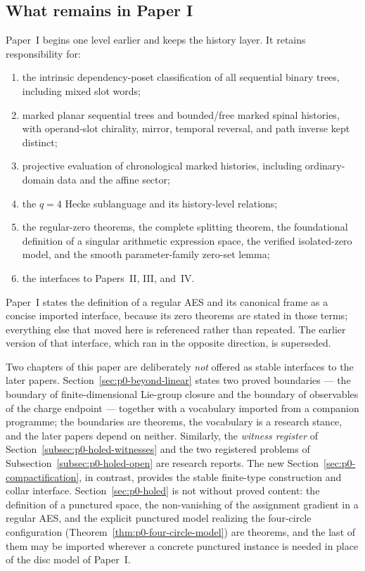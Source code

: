\subsection{What remains in Paper I}

Paper~I begins one level earlier and keeps the history layer.  It retains
responsibility for:

\begin{enumerate}
  \item the intrinsic dependency-poset classification of all sequential binary
  trees, including mixed slot words;

  \item marked planar sequential trees and bounded/free marked spinal
  histories, with operand-slot chirality, mirror, temporal reversal, and path
  inverse kept distinct;

  \item projective evaluation of chronological marked histories, including
  ordinary-domain data and the affine sector;
  
  \item the $q=4$ Hecke sublanguage and its history-level relations;

  \item the regular-zero theorems, the complete splitting theorem, the
  foundational definition of a singular arithmetic expression space, the
  verified isolated-zero model, and the smooth parameter-family zero-set lemma;

  \item the interfaces to Papers~II, III, and~IV.
\end{enumerate}

Paper~I states the definition of a regular AES and its canonical frame as a
concise imported interface, because its zero theorems are stated in those terms;
everything else that moved here is referenced rather than repeated.  The earlier
version of that interface, which ran in the opposite direction, is superseded.

Two chapters of this paper are deliberately \emph{not} offered as stable interfaces
to the later papers.  Section~\ref{sec:p0-beyond-linear} states two proved
boundaries --- the boundary of finite-dimensional Lie-group closure and the
boundary of observables of the charge endpoint --- together with a vocabulary
imported from a companion programme; the boundaries are theorems, the vocabulary
is a research stance, and the later papers depend on neither.  Similarly, the
\emph{witness register} of Section~\ref{subsec:p0-holed-witnesses} and the two
registered problems of Subsection~\ref{subsec:p0-holed-open} are research
reports.  The new Section~\ref{sec:p0-compactification}, in contrast, provides
the stable finite-type construction and collar interface.  Section~\ref{sec:p0-holed}
is not without proved content: the definition of
a punctured space, the non-vanishing of the assignment gradient in a regular AES,
and the explicit punctured model realizing the four-circle configuration
(Theorem~\ref{thm:p0-four-circle-model}) are theorems, and the last of them may be
imported wherever a concrete punctured instance is needed in place of the disc
model of Paper~I.

